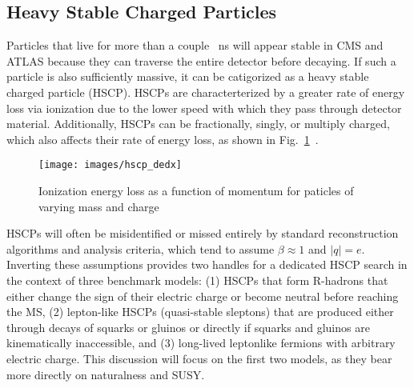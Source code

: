 \documentclass[12pt]{article}
\begin{document}
    \subsection{Heavy Stable Charged Particles}
        Particles that live for more than a couple \SI{}{ns} will appear stable in CMS and ATLAS because they can traverse the entire detector before decaying. If such a particle is also sufficiently massive, it can be catigorized as a heavy stable charged particle (HSCP). HSCPs are characterterized by a greater rate of energy loss via ionization due to the lower speed with which they pass through detector material. Additionally, HSCPs can be fractionally, singly, or multiply charged, which also affects their rate of energy loss, as shown in Fig.~\ref{hscp_dedx}~\cite{cms_hscp}.

        \noindent \begin{figure}[htbp] \begin{center}
        \texttt{[image: images/hscp\_dedx]}
            \caption{Ionization energy loss as a function of momentum for paticles of varying mass and charge~\cite{cms_hscp}}
        \label{hscp_dedx}
        \end{center} \end{figure}

        HSCPs will often be misidentified or missed entirely by standard reconstruction algorithms and analysis criteria, which tend to assume $\beta \approx \num{1}$ and $\lvert q \rvert = e$. Inverting these assumptions provides two handles for a dedicated HSCP search in the context of three benchmark models: (1) HSCPs that form R-hadrons that either change the sign of their electric charge or become neutral before reaching the MS, (2) lepton-like HSCPs (quasi-stable sleptons) that are produced either through decays of squarks or gluinos or directly if squarks and gluinos are kinematically inaccessible, and (3) long-lived leptonlike fermions with arbitrary electric charge. This discussion will focus on the first two models, as they bear more directly on naturalness and SUSY.

         
\end{document}
